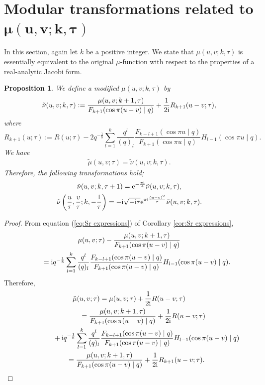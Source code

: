 \documentclass[pdftex]{sigma}
\numberwithin{equation}{section}
\newtheorem{prop}[thm]{Proposition}
\theoremstyle{definition}
\begin{document}
\section[Modular transformations related to mu(u,v;k,tau)]{Modular transformations related to $\boldsymbol{\mu(u,v;k,\tau)}$}\label{section4}
In this section, again let $k$ be a positive integer.
We state that $\mu(u,v;k,\tau)$ is essentially equivalent to the original $\mu$-function with respect to the properties of a real-analytic Jacobi form.
\begin{prop}
We define a modified $\mu(u,v;k,\tau)$ by
\begin{gather*}
\tilde{\nu} (u,v;k,\tau)
 :=
 \frac{\mu(u,v;k+1,\tau)}{F_{k+1}(\cos\pi(u-v)\mid q)}+\frac{1}{2{\rm i}}R_{k+1}(u-v;\tau),
\end{gather*}
where
\[
R_{k+1}(u;\tau):=R(u;\tau)-2q^{-\frac{1}{8}}\sum_{l=1}^k\frac{q^l}{(q)_l}\frac{F_{k-l+1}(\cos\pi u\mid q)}{F_{k+1}(\cos\pi u\mid q)}H_{l-1}(\cos\pi u \mid q).
\]
We have
\begin{gather*}
\tilde{\mu}(u,v;\tau)=\tilde{\nu} (u,v;k,\tau).
\end{gather*}
Therefore, the following transformations hold;
\begin{gather}
\label{eq:tnu +1}
\tilde{\nu} (u,v;k,\tau+1)
 =
 {\rm e}^{-\frac{\pi{\rm i}}{4}}\tilde{\nu}(u,v;k,\tau ), \\
\label{eq:tnu +tau}
\tilde{\nu} \left(\frac{u}{\tau},\frac{v}{\tau};k,-\frac{1}{\tau}\right)
 =
 -{\rm i}\sqrt{-{\rm i}\tau}{\rm e}^{\pi{\rm i}\frac{(u-v)^2}{\tau}}\tilde{\nu} (u,v;k,\tau ).
\end{gather}
\end{prop}
\begin{proof}
From equation (\ref{eq:Sr expressions}) of Corollary \ref{cor:Sr expressions},
\begin{gather*}
 \mu(u,v;\tau)-\frac{\mu(u,v;k+1,\tau)}{F_{k+1}(\cos\pi(u-v)\mid q)} \\
\qquad{} =
 {\rm i}q^{-\frac{1}{8}}\sum_{l=1}^k\frac{q^l}{(q)_l}\frac{F_{k-l+1}(\cos\pi(u-v)\mid q)}{F_{k+1}(\cos\pi(u-v)\mid q)}H_{l-1}(\cos\pi(u-v)\mid q). %
\end{gather*}
Therefore,
\begin{gather*}
\tilde{\mu}(u,v;\tau)
 =
 \mu(u,v;\tau)+\frac{1}{2{\rm i}}R(u-v;\tau) \\
\hphantom{\tilde{\mu}(u,v;\tau)}{}
=\frac{\mu(u,v;k+1,\tau)}{F_{k+1}(\cos\pi(u-v)\mid q)}+\frac{1}{2{\rm i}}R(u-v;\tau) \\
\hphantom{\tilde{\mu}(u,v;\tau)=}{}
 +{\rm i}q^{-\frac{1}{8}}\sum_{l=1}^k\frac{q^l}{(q)_l}\frac{F_{k-l+1}(\cos\pi(u-v)\mid q)}{F_{k+1}(\cos\pi(u-v)\mid q)}H_{l-1}(\cos\pi(u-v)\mid q) \\
\hphantom{\tilde{\mu}(u,v;\tau)}{}
=
 \frac{\mu(u,v;k+1,\tau)}{F_{k+1}(\cos\pi(u-v)\mid q)}+\frac{1}{2{\rm i}}R_{k+1}(u-v;\tau).\tag*{\qed}
\end{gather*}\renewcommand{\qed}{}
\end{proof}
\end{document}
